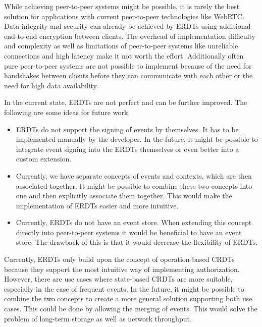\documentclass[
	english,
	ruledheaders=section,   %
	class=report,		    %
	thesis={type=bachelor}, %
	accentcolor=9c,			%
	custommargins=true,    %
	marginpar=false,        %
	parskip=half-,          %
	fontsize=11pt,          %
]{tudapub}
\begin{document}
While achieving peer-to-peer systems might be possible, it is rarely the best solution for applications with current peer-to-peer technologies like WebRTC. Data integrity and security can already be achieved by ERDTs using additional end-to-end encryption between clients. The overhead of implementation difficulty and complexity as well as limitations of peer-to-peer systems like unreliable connections and high latency make it not worth the effort. Additionally often pure peer-to-peer systems are not possible to implement because of the need for handshakes between clients before they can communicate with each other or the need for high data availability.

In the current state, ERDTs are not perfect and can be further improved. The following are some ideas for future work.

\begin{itemize}
  \item ERDTs do not support the signing of events by themselves. It has to be implemented manually by the developer. In the future, it might be possible to integrate event signing into the ERDTs themselves or even better into a custom extension.
  \item Currently, we have separate concepts of events and contexts, which are then associated together. It might be possible to combine these two concepts into one and then explicitly associate them together. This would make the implementation of ERDTs easier and more intuitive.
  \item Currently, ERDTs do not have an event store. When extending this concept directly into peer-to-peer systems it would be beneficial to have an event store. The drawback of this is that it would decrease the flexibility of ERDTs.
\end{itemize}

Currently, ERDTs only build upon the concept of operation-based CRDTs because they support the most intuitive way of implementing authorization. However, there are use cases where state-based CRDTs are more suitable, especially in the case of frequent events. In the future, it might be possible to combine the two concepts to create a more general solution supporting both use cases. This could be done by allowing the merging of events. This would solve the problem of long-term storage as well as network throughput. 

\printbibliography
\end{document}
